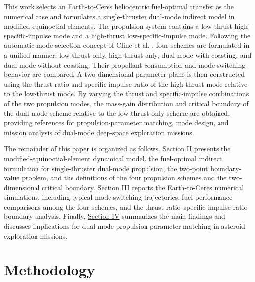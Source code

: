 ﻿\documentclass{IEEEtaes}
\begin{document}
This work selects an Earth-to-Ceres heliocentric fuel-optimal transfer as the numerical case and formulates a single-thruster dual-mode indirect model in modified equinoctial elements. The propulsion system contains a low-thrust high-specific-impulse mode and a high-thrust low-specific-impulse mode. Following the automatic mode-selection concept of Cline et al. \cite{cline2024a}, four schemes are formulated in a unified manner: low-thrust-only, high-thrust-only, dual-mode with coasting, and dual-mode without coasting. Their propellant consumption and mode-switching behavior are compared. A two-dimensional parameter plane is then constructed using the thrust ratio and specific-impulse ratio of the high-thrust mode relative to the low-thrust mode. By varying the thrust and specific-impulse combinations of the two propulsion modes, the mass-gain distribution and critical boundary of the dual-mode scheme relative to the low-thrust-only scheme are obtained, providing references for propulsion-parameter matching, mode design, and mission analysis of dual-mode deep-space exploration missions.

The remainder of this paper is organized as follows. \hyperref[sec:methodology]{Section II} presents the modified-equinoctial-element dynamical model, the fuel-optimal indirect formulation for single-thruster dual-mode propulsion, the two-point boundary-value problem, and the definitions of the four propulsion schemes and the two-dimensional critical boundary. \hyperref[sec:simulation]{Section III} reports the Earth-to-Ceres numerical simulations, including typical mode-switching trajectories, fuel-performance comparisons among the four schemes, and the thrust-ratio--specific-impulse-ratio boundary analysis. Finally, \hyperref[sec:conclusions]{Section IV} summarizes the main findings and discusses implications for dual-mode propulsion parameter matching in asteroid exploration missions.

\section{Methodology}
\label{sec:methodology}
\end{document}
